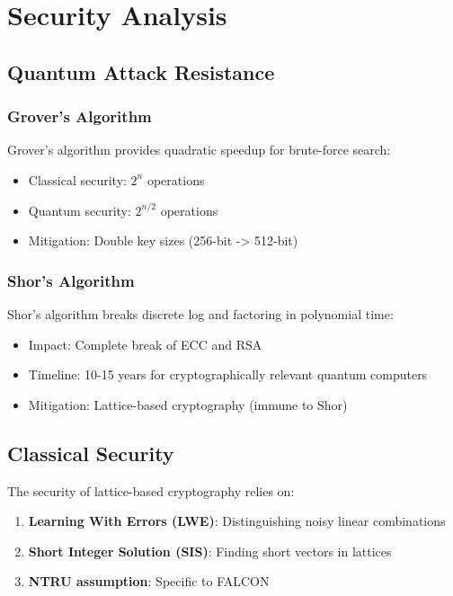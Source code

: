 \section{Security Analysis}


\subsection{Quantum Attack Resistance}

\subsubsection{Grover's Algorithm}
Grover's algorithm provides quadratic speedup for brute-force search:
\begin{itemize}
\item Classical security: $2^n$ operations
\item Quantum security: $2^{n/2}$ operations
\item Mitigation: Double key sizes (256-bit -> 512-bit)
\end{itemize}

\subsubsection{Shor's Algorithm}
Shor's algorithm breaks discrete log and factoring in polynomial time:
\begin{itemize}
\item Impact: Complete break of ECC and RSA
\item Timeline: 10-15 years for cryptographically relevant quantum computers
\item Mitigation: Lattice-based cryptography (immune to Shor)
\end{itemize}

\subsection{Classical Security}

The security of lattice-based cryptography relies on:

\begin{enumerate}
\item \textbf{Learning With Errors (LWE)}: Distinguishing noisy linear combinations
\item \textbf{Short Integer Solution (SIS)}: Finding short vectors in lattices
\item \textbf{NTRU assumption}: Specific to FALCON
\end{enumerate}

